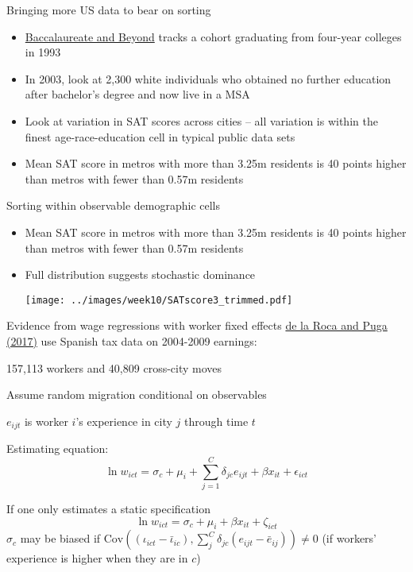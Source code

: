 \documentclass[11pt,notes=hide,aspectratio=169]{beamer}
\begin{document}
\begin{frame}{Bringing more US data to bear on sorting}
\begin{itemize}
	\item \href{https://nces.ed.gov/surveys/b&b/}{Baccalaureate and Beyond} tracks a cohort graduating from four-year colleges in 1993 
	\item In 2003, look at 2,300 white individuals who obtained no further education after bachelor's degree and now live in a MSA
	\item Look at variation in SAT scores across cities -- all variation is within the finest age-race-education cell in typical public data sets
	\item Mean SAT score in metros with more than 3.25m residents is 40 points higher than metros with fewer than 0.57m residents
\end{itemize}
\end{frame}
\begin{frame}{Sorting within observable demographic cells}
\begin{itemize}
	\item Mean SAT score in metros with more than 3.25m residents is 40 points higher than metros with fewer than 0.57m residents
	\item Full distribution suggests stochastic dominance
	\begin{center}\texttt{[image: ../images/week10/SATscore3\_trimmed.pdf]}\end{center}
\end{itemize}
\end{frame}
\begin{frame}{Evidence from wage regressions with worker fixed effects}
\href{https://academic.oup.com/restud/article/84/1/106/2669971}{de la Roca and Puga (2017)}
use Spanish tax data on 2004-2009 earnings:
\begin{itemize}{
	\item 157,113 workers and 40,809 cross-city moves
	\item Assume random migration conditional on observables
	\item $e_{ijt}$ is worker $i$'s experience in city $j$ through time $t$
\item Estimating equation:
\begin{equation*}
\ln w_{ict} = \sigma_c + \mu_i + \sum_{j=1}^{C} \delta_{jc} e_{ijt} + \beta x_{it} + \epsilon_{ict}
\end{equation*}
\item
If one only estimates a static specification
\begin{equation*}
\ln w_{ict} = \sigma_c + \mu_i  + \beta x_{it} + \zeta_{ict}
\end{equation*}
$\hat{\sigma}_{c}$ may be biased if
$\text{Cov}\left((\iota_{ict} - \bar{\iota}_{ic}),\sum_{j}^{C} \delta_{jc} (e_{ijt} - \bar{e}_{ij})\right) \neq 0$
(if workers' experience is higher when they are in $c$)
}\end{itemize}
\end{frame}
\end{document}
